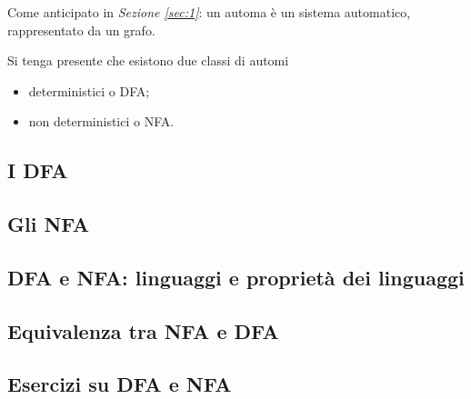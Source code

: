 \documentclass{subfiles}
\begin{document}
Come anticipato in \emph{Sezione \eqref{sec:1}}: un automa è un sistema automatico, rappresentato da un grafo.

\noindent Si tenga presente che esistono due classi di automi
\begin{itemize}
    \item deterministici o DFA;
    \item non deterministici o NFA.
\end{itemize}

\subsection{I DFA}


\subsection{Gli NFA}


\subsection{DFA e NFA: linguaggi e proprietà dei linguaggi}


\subsection{Equivalenza tra NFA e DFA}


\subsection{Esercizi su DFA e NFA}

\end{document}
